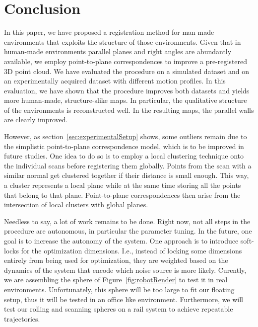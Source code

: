 \section{Conclusion}

In this paper, we have proposed a registration method for man made environments that exploits the structure of those environments. 
Given that in human-made environments parallel planes and right angles are abundantly available, we employ point-to-plane correspondences to improve a pre-registered 3D point cloud. 
We have evaluated the procedure on a simulated dataset and on an experimentally acquired dataset with different motion profiles. 
In this evaluation, we have shown that the procedure improves both datasets and yields more human-made, structure-slike maps. 
In particular, the qualitative structure of the environments is reconstructed well. 
In the resulting maps, the parallel walls are clearly improved.

However, as section~\ref{sec:experimentalSetup} shows, some outliers remain due to the simplistic point-to-plane correspondence model, which is to be improved in future studies.
One idea to do so is to employ a local clustering technique onto the individual scans before registering them globally. 
Points from the scan with a similar normal get clustered together if their distance is small enough.
This way, a cluster represents a local plane while at the same time storing all the points that belong to that plane.
Point-to-plane correspondences then arise from the intersection of local clusters with global planes.

Needless to say, a lot of work remains to be done. 
%
Right now, not all steps in the procedure are autonomous, in particular the parameter tuning. 
In the future, one goal is to increase the autonomy of the system.
One approach is to introduce soft-locks for the optimization dimensions.
I.e., instead of locking some dimensions entirely from being used for optimization, they are weighted based on the dynamics of the system that encode which noise source is more likely.  
%
Curently, we are assembling the sphere of Figure~\ref{fig:robotRender} to test it in real environments.
Unfortunately, this sphere will be too large to fit our floating setup, thus it will be tested in an office like environment.
Furthermore, we will test our rolling and scanning spheres on a rail system to achieve repeatable trajectories. 
